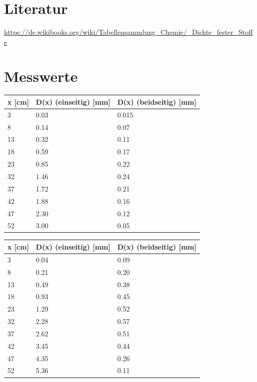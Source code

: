 \section{Literatur}

\hyperlink{Dichte}{https://de.wikibooks.org/wiki/Tabellensammlung_Chemie/_Dichte_fester_Stoffe}

\section{Messwerte}

\begin{minipage}{\linewidth}
    \begin{table}[H]
        \centering
    \begin{tabular}{lll}
        \toprule
        x [cm] & D(x) (einseitig) [mm] & D(x) (beidseitig) [mm] \\
        \midrule
        3  & 0.03 & 0.015 \\
        8  & 0.14 & 0.07  \\
        13 & 0.32 & 0.11  \\
        18 & 0.59 & 0.17  \\
        23 & 0.85 & 0.22  \\
        32 & 1.46 & 0.24  \\
        37 & 1.72 & 0.21  \\
        42 & 1.88 & 0.16  \\
        47 & 2.30 & 0.12  \\
        52 & 3.00 & 0.05  \\
        \bottomrule   
    \end{tabular}
    
    \label{tab:1}
\end{table}
\end{minipage}


\begin{minipage}{\linewidth}
    \begin{table}[H]
        \centering
    \begin{tabular}{lll}
        \toprule
        x [cm] & D(x) (einseitig) [mm] & D(x) (beidseitig) [mm] \\
        \midrule
        3  & 0.04 & 0.09 \\
        8  & 0.21 & 0.20 \\
        13 & 0.49 & 0.38 \\
        18 & 0.93 & 0.45 \\
        23 & 1.29 & 0.52 \\
        32 & 2.28 & 0.57 \\
        37 & 2.62 & 0.51 \\
        42 & 3.45 & 0.44 \\
        47 & 4.35 & 0.26 \\
        52 & 5.36 & 0.11 \\
        \bottomrule   
    \end{tabular}
    
    \label{tab:2}
\end{table}
\end{minipage}

